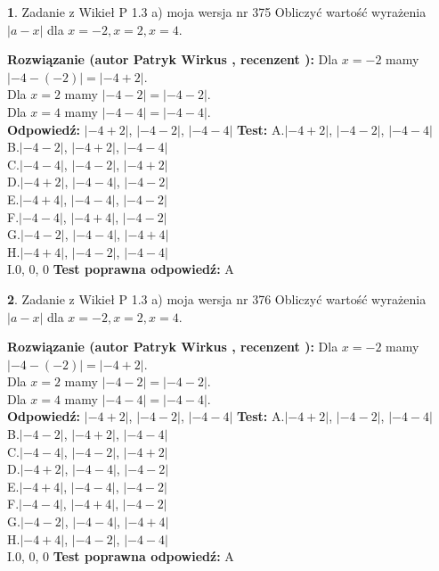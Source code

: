 \documentclass[12pt, a4paper]{article}
\theoremstyle{definition} %
\newtheorem{zad}{}
\newcommand{\zadStart}[1]{\begin{zad}#1\newline}
\newcommand{\zadStop}{\end{zad}}
\newcommand{\rozwStart}[2]{\noindent \textbf{Rozwiązanie (autor #1 , recenzent #2): }\newline}
\newcommand{\rozwStop}{\newline}
\newcommand{\odpStart}{\noindent \textbf{Odpowiedź:}\newline}
\newcommand{\odpStop}{\newline}
\newcommand{\testStart}{\noindent \textbf{Test:}\newline}
\newcommand{\testStop}{\newline}
\newcommand{\kluczStart}{\noindent \textbf{Test poprawna odpowiedź:}\newline}
\newcommand{\kluczStop}{\newline}
\begin{document}
\zadStart{Zadanie z Wikieł P 1.3 a) moja wersja nr 375}
Obliczyć wartość wyrażenia $|a - x|$ dla $x=-2,x=2,x=4$.
\zadStop
\rozwStart{Patryk Wirkus}{}
Dla $x = -2$ mamy $|-4 - (-2)| = |-4 + 2|$.\\
Dla $x = 2$ mamy $|-4 - 2| = |-4 - 2|$.\\
Dla $x = 4$ mamy $|-4 - 4| = |-4 - 4|$.\\
\rozwStop
\odpStart
$|-4 + 2|$, $|-4 - 2|$, $|-4 - 4|$
\odpStop
\testStart
A.$|-4 + 2|$, $|-4 - 2|$, $|-4 - 4|$\\
B.$|-4 - 2|$, $|-4 + 2|$, $|-4 - 4|$\\
C.$|-4 - 4|$, $|-4 - 2|$, $|-4 + 2|$\\
D.$|-4 + 2|$, $|-4 - 4|$, $|-4 - 2|$\\
E.$|-4 + 4|$, $|-4 - 4|$, $|-4 - 2|$\\
F.$|-4 - 4|$, $|-4 + 4|$, $|-4 - 2|$\\
G.$|-4 - 2|$, $|-4 - 4|$, $|-4 + 4|$\\
H.$|-4 + 4|$, $|-4 - 2|$, $|-4 - 4|$\\
I.$0$, $0$, $0$
\testStop
\kluczStart
A
\kluczStop



\zadStart{Zadanie z Wikieł P 1.3 a) moja wersja nr 376}
Obliczyć wartość wyrażenia $|a - x|$ dla $x=-2,x=2,x=4$.
\zadStop
\rozwStart{Patryk Wirkus}{}
Dla $x = -2$ mamy $|-4 - (-2)| = |-4 + 2|$.\\
Dla $x = 2$ mamy $|-4 - 2| = |-4 - 2|$.\\
Dla $x = 4$ mamy $|-4 - 4| = |-4 - 4|$.\\
\rozwStop
\odpStart
$|-4 + 2|$, $|-4 - 2|$, $|-4 - 4|$
\odpStop
\testStart
A.$|-4 + 2|$, $|-4 - 2|$, $|-4 - 4|$\\
B.$|-4 - 2|$, $|-4 + 2|$, $|-4 - 4|$\\
C.$|-4 - 4|$, $|-4 - 2|$, $|-4 + 2|$\\
D.$|-4 + 2|$, $|-4 - 4|$, $|-4 - 2|$\\
E.$|-4 + 4|$, $|-4 - 4|$, $|-4 - 2|$\\
F.$|-4 - 4|$, $|-4 + 4|$, $|-4 - 2|$\\
G.$|-4 - 2|$, $|-4 - 4|$, $|-4 + 4|$\\
H.$|-4 + 4|$, $|-4 - 2|$, $|-4 - 4|$\\
I.$0$, $0$, $0$
\testStop
\kluczStart
A
\kluczStop
\end{document}
